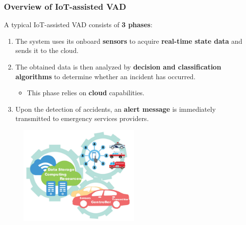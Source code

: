 \documentclass{beamer}
\begin{document}
\begin{frame}
  \frametitle{Overview of IoT-assisted VAD}
  
  A typical IoT-assisted VAD consists of \textbf{3 phases}:
  \begin{enumerate}
    \item The system uses its onboard \textbf{sensors} to acquire
      \textbf{real-time state data} and sends it to the cloud.
    \item The obtained data
    is then analyzed by \textbf{decision and
    classification algorithms} to determine
    whether an incident has occurred.
    \begin{itemize}
      \item This phase relies on \textbf{cloud} capabilities.
    \end{itemize}
    \item Upon the detection of accidents, an
    \textbf{alert message} is immediately transmitted to emergency services providers.
    \end{enumerate} 

    \begin{figure}[t]
      \includegraphics[width=6cm]{images/iot-vad.png}
      \centering
      \end{figure}
\end{frame}
\end{document}
